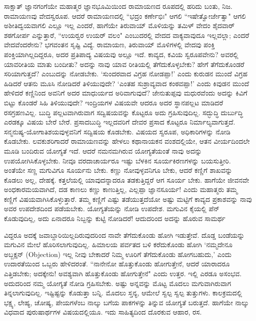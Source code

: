 ಸಾಕ್ಷಾತ್‍ ಜ್ಞಾನಗಂಗೆಯೇ ಮಹಾತ್ಮರ ಜ್ಞಾನಭೂಮಿಯಿಂದ ರಾಮಾಯಣದ ರೂಪದಲ್ಲಿ ಹರಿದು ಬಂತು, ನಿಜ. ರಾಮಾಯಣವು ವೇದಸ್ವರೂಪ. ಆದರೆ ರಾಮಾಯಣದಲ್ಲಿ ``ಭದ್ರಂ ಕರ್ಣೇಭಿಃ" ಆಗಲಿ ``ಇಷೇತ್ವೋರ್ಜೇತ್ವಾ" ಆಗಲಿ ಅಶೀತಿದ್ವಯವಾಗಲಿ ಎಲ್ಲೂ ಇಲ್ಲ ಎಂದರೆ, ಹಾಗೆಯೇ ತಿರುವಾಯ್‍ ಮೊಳಿಯನ್ನು ತಮಿಳ್‍ ವೇದಂ ಶೈದವಾರ್‍ ಶಠಗೋರ್ಪ ಎನ್ನುತ್ತಾರೆ, ``ಉಯರ್‍ವರ ಉಯರ್‍ ವಲಂ" ಎಂಬುದರಲ್ಲಿ ವೇದದ ವಾಕ್ಯವಾವುದೂ ಇಲ್ಲವಲ್ಲಾ; ಎಂದರೆ ವೇದವೆಂದರೇನು? ಭಗವಂತನ ಸೃಷ್ಟಿ ವಿದ್ಯೆ. ರಾಮಾಯಣ, ತಿರುವಾಯ್‍ ಮೊಳಿಗಳಲ್ಲಿ ವೇದವು ಪಂಕ್ತಿ ಪಂಕ್ತಿಯಾಗಿಲ್ಲದಿದ್ದರೂ, ಅದರ ಪ್ರತಿಪಾದ್ಯ ವಿಷಯವು ಅಲ್ಲೂ ಇದೆ. ಕಾವ್ಯದ, ಕವಿಯ ಸ್ವರೂಪವೇನು? ಅವರಲ್ಲಿ ಯಾವರೀತಿಯ ಮಾತು ಬಂದೀತು? ಅದನ್ನು ನಾವು ಯಾವ ರೀತಿಯಲ್ಲಿ ತೆಗೆದುಕೊಳ್ಳಬೇಕು? ಹೇಗೆ ತೆಗೆದುಕೊಂಡರೆ ಸರಿಯಾಗುತ್ತದೆ? ಎಂಬುದನ್ನು ನೋಡಬೇಕು. `ಸುಂದರವಾದ ವಿಗ್ರಹ ನೋಡಪ್ಪಾ!' ಎಂದು ಕುರುಡನ ಮುಂದೆ ವಿಗ್ರಹ ಹಿಡಿದರೆ ಆತನು ಮೂಸಿ ನೋಡಿದರೆ ತಿಳಿಯುವುದೇ? `ಎಂತಹ ಸುಶ್ರಾವ್ಯವಾದ ಕಂಠವಪ್ಪಾ!' ಎಂದು ಕಿವುಡನ ಮುಂದೆ ಹೇಳಿದರೆ ಕಣ್ಣಿನಿಂದ ಅವನಿಗೆ ಅದರ ಮಾಧುರ್ಯದ ಅರಿವಾಗುವುದೆ? ಜೇನುತುಪ್ಪವು ಮಧುರವೆಂದು ಅದನ್ನು ಕಿವಿಗೆ ಬಿಟ್ಟು ಕೊಂಡರೆ ಸಿಹಿ ತಿಳಿಯುವುದೇ? ಇಂದ್ರಿಯಗಳ ವಿಷಯವೇ ಆದರೂ ಅದರ ಸ್ಥಾನಪಲ್ಲಟ ಮಾಡಿದರೆ ರಸಗ್ರಹಣವಿಲ್ಲ. ಬುದ್ಧಿ ಪಲ್ಲಟವಾಗಿರುವಾಗ ಸದ್ವಿಷಯವನ್ನು ಕೊಟ್ಟರೂ ಅದು ಗ್ರಹಿಸುವುದಿಲ್ಲ. ಸದ್ಭುದ್ಧಿ ದುರ್ಬುದ್ಧಿ ಎರಡಕ್ಕೂ ವಿಷಯ ಬೇರೆ ಬೇರೆ. ಪ್ರಸಾದಬುದ್ಧಿ ಇಲ್ಲದವರಿಗೆ ದೇವರ ಪ್ರಸಾದ ಕೊಟ್ಟರೂ ನಿರ್ಮಾಲ್ಯವಾಗುತ್ತದೆ. ಸನ್ಮನುಷ್ಯ-ಯೋಗಾತಿಶಯವುಳ್ಳವನಿಗೆ ಸದ್ವಿಷಯ ಕೊಡಬೇಕು. ವಿಷಯದ ಸ್ವರೂಪ, ಅಧಿಕಾರಿಗಳನ್ನು ನೋಡಿ ಕೊಡಬೇಕು. ಲವಕುಶರಿಗಾದರೆ ರಾಮಾಯಣವನ್ನು ಹೇಳಲು ಕಥಾನಾಯಕನ ವಂಶದಲ್ಲಿಯೇ, ಆತನ ವೀರ್ಯದಿಂದಲೇ ಮೂಡಿ ಬಂದಿರುವ ಯೋಗ್ಯತೆ ಇದೆ. ಆದರೆ ನಮನಮಗಿರುವ ಯೋಗ್ಯತೆಯಂತೆ ನಾವು ಅದನ್ನು ಉಪಯೋಗಿಸಿಕೊಳ್ಳಬೇಕು. ನೀವೂ ವರದಾಚಾರ್ಯರೂ ಇಷ್ಟು ಬೆಳಕಿನ ಸೂರ್ಯಕಿರಣಗಳನ್ನು ಬಯಸುತ್ತೀರಿ. ಅಂತೆಯೇ ಸಣ್ಣ ಮಗುವಿಗೂ ಸೂರ್ಯನು ಬೇಕು. ಕಣ್ಣು ನೋವುಳ್ಳವನಿಗೂ ಬೇಕು, ಆದರೆ ಕಣ್ಣಿಗೆ ಶಾಖವನ್ನು ಕೊಡಲು ಅಲ್ಲ, ದೇಹಕ್ಕೆ. ಕತ್ತಲೆಯಲ್ಲಿ ಯಾವುದನ್ನಾದರೂ ತಡಕುತ್ತಿದ್ದರೆ ಆಗ ಸೂರ್ಯ ಬೇಕು. ಹಾಗೆಯೇ ಜೀವನವೇ ಅಂಧಕಾರಮಯವಾಗಿದೆ, ದಡ ಕಾಣಲು ಕಣ್ಣು ಕಾಣುತ್ತಿಲ್ಲ, ಎಲ್ಲಪ್ಪಾ ಜ್ಞಾನಸೂರ್ಯ! ಎಂದು ಮಹಾತ್ಮರು ತಮ್ಮ ಕಣ್ಣಿಗೆ ವಿಷಯವಾಗಿಸಿಕೊಳ್ಳುತ್ತಾರೆ. ತಮ್ಮ ಕಣ್ಣಿಗೆ ಎಷ್ಟು ತಡೆಯುತ್ತದೆಯೋ ಅಷ್ಟು ಮಟ್ಟಿಗೆ ಕಾವ್ಯದ ಪ್ರಕಾಶವನ್ನು ನಾವು ಅವರ ಉಪದೇಶದಿಂದ ಪಡೆಯಬೇಕು. ಯೋಗ್ಯತೆಯನ್ನು ನೋಡಿ ಉಪದೇಶ. ಮಗುವಿನ ಕೈಯಲ್ಲಿ ಪೆನ್‍ ಕೊಡುವುದಿಲ್ಲ, ಅದು ಏನಾದರೂ ನಿಬ್ಬನ್ನು ಕುಟ್ಟಿ ನೋಡಿದರೆ! ಆದುದರಿಂದ ಅದನ್ನು ಹೊರುವ ಸಾಮರ್ಥ


ವಿದ್ದರೂ ಅದಕ್ಕೆ ಜವಾಬ್ದಾರಿಯಿಲ್ಲದಿರುವುದರಿಂದ ನಾವೇ ತೆಗೆದುಕೊಂಡು ಹೋಗಿ ಇಡುತ್ತೇವೆ. ದೊಡ್ಡ ಬಂಡೆಯನ್ನು ಮಗುವಿನ ಮೇಲೆ ಹೊರಿಸಲಾಗುವುದಿಲ್ಲ. ಹಿಮಾಲಯ ಪರ್ವತದ ಬಳಿ ಕರೆದುಕೊಂಡು ಹೋಗಿ `ನಮ್ಮದೇನೂ ಅಬ್ಜಕ್ಷನ್‍ {\rm (Objection)} ಇಲ್ಲ ನೀವು ಬೇಕಾದರೆ ನಿಮ್ಮ ಊರಿಗೆ ತೆಗೆದುಕೊಂಡು ಹೋಗಬಹುದು,' ಎಂದು ಉದಾರತೆಯಿಂದ ಒಬ್ಬರು ಹೇಳಿದರಂತೆ. ``ನಾನೇನೋ ಹೊತ್ತುಕೊಂಡು ಹೋಗುತ್ತೇನೆ, ಆದರೆ ಯಾರಾದರೂ ಎತ್ತಿಡಬೇಕು; ಅದಕ್ಕೇನು! ಅವಶ್ಯವಾಗಿ ಹೊತ್ತುಕೊಂಡು ಹೋಗುತ್ತೇನೆ" ಎಂದು ಉತ್ತರ. ಇಲ್ಲಿ ಎರಡೂ ಅಸಂಭವ. ಅದುದರಿಂದ ನಮ್ಮ ಯೋಗ್ಯತೆ ನೋಡಿ ಗ್ರಹಿಸಬೇಕು. ಅಷ್ಟು ಅನ್ನವನ್ನು ಮೊಟ್ಟ ಮೊದಲು ಮಗುವಾಗಿರುವಾಗ ತಿನ್ನಲಾಗುವುದಿಲ್ಲ. ಇಷ್ಟಿಷ್ಟನ್ನು ಕೊಡುತ್ತಾ ಬನ್ನಿ. ಮೊದಲು ಸ್ತನ್ಯ, ಆಮೇಲೆ ಸ್ವಲ್ಪ ಸ್ವಲ್ಪ ತುತ್ತುಗಳು. ಕಾಲಕ್ರಮದಲ್ಲಿ ಭಕ್ಷ್ಯ, ಲೇಹ್ಯ, ಚೋಷ್ಯ, ಪೇಯಗಳೆಂಬ ನಾಲ್ಕು ಬಗೆಯ ಪಾಕಗಳನ್ನು ತಿನ್ನುವ ಯೋಗ್ಯತೆ ಬರುತ್ತದೆ. ಹಾಗೆಯೇ ನಾಲ್ಕು ವಿಧವಾದ ಪುರುಷಾರ್ಥಗಳ ವಿಷಯದಲ್ಲಿಯೂ. ಇದು ಸಾಹಿತ್ಯದಿಂದ ದೊರಕುವ ಆಹಾರ, ರಸ. 


